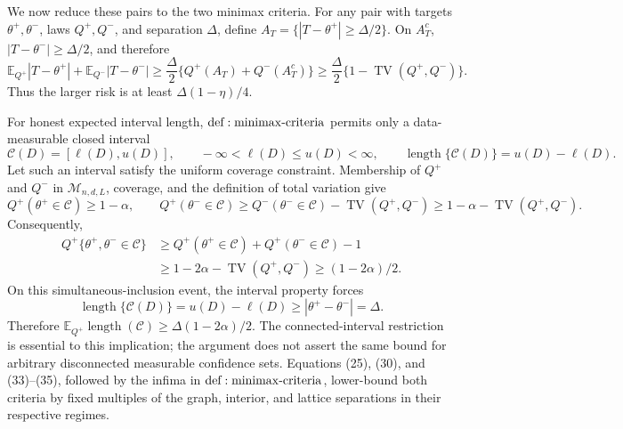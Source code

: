 We now reduce these pairs to the two minimax criteria.  For any pair with targets \(\theta^+,\theta^-\), laws \(Q^+,Q^-\), and separation \(\Delta\), define \(A_T=\{|T-\theta^+|\geq\Delta/2\}\).  On \(A_T^c\), \(|T-\theta^-|\geq\Delta/2\), and therefore
\[
 \mathbb E_{Q^+}|T-\theta^+|+\mathbb E_{Q^-}|T-\theta^-|
 \geq\frac\Delta2\{Q^+(A_T)+Q^-(A_T^c)\}
 \geq\frac\Delta2\{1-\operatorname{TV}(Q^+,Q^-)\}.
\tag{34}
\]
Thus the larger risk is at least \(\Delta(1-\eta)/4\).

For honest expected interval length, \({\rm def:minimax\text{-}criteria}\) permits only a data-measurable closed interval
\[
 \mathcal C(D)=[\ell(D),u(D)],
 \qquad -\infty<\ell(D)\leq u(D)<\infty,
 \qquad \operatorname{length}\{\mathcal C(D)\}=u(D)-\ell(D).
\]
Let such an interval satisfy the uniform coverage constraint.  Membership of \(Q^+\) and \(Q^-\) in \(\mathcal M_{n,d,L}\), coverage, and the definition of total variation give
\[
 Q^+(\theta^+\in\mathcal C)\geq1-\alpha,
 \qquad
 Q^+(\theta^-\in\mathcal C)
 \geq Q^-(\theta^-\in\mathcal C)-\operatorname{TV}(Q^+,Q^-)
 \geq1-\alpha-\operatorname{TV}(Q^+,Q^-).
\]
Consequently,
\[
\begin{aligned}
 Q^+\{\theta^+,\theta^-\in\mathcal C\}
 &\geq Q^+(\theta^+\in\mathcal C)+Q^+(\theta^-\in\mathcal C)-1\\
 &\geq1-2\alpha-\operatorname{TV}(Q^+,Q^-)\geq(1-2\alpha)/2.
\end{aligned}
\tag{35}
\]
On this simultaneous-inclusion event, the interval property forces
\[
 \operatorname{length}\{\mathcal C(D)\}
 =u(D)-\ell(D)\geq|\theta^+-\theta^-|=\Delta.
\]
Therefore \(\mathbb E_{Q^+}\operatorname{length}(\mathcal C)\geq\Delta(1-2\alpha)/2\).  The connected-interval restriction is essential to this implication; the argument does not assert the same bound for arbitrary disconnected measurable confidence sets.  Equations (25), (30), and (33)--(35), followed by the infima in \({\rm def:minimax\text{-}criteria}\), lower-bound both criteria by fixed multiples of the graph, interior, and lattice separations in their respective regimes.

